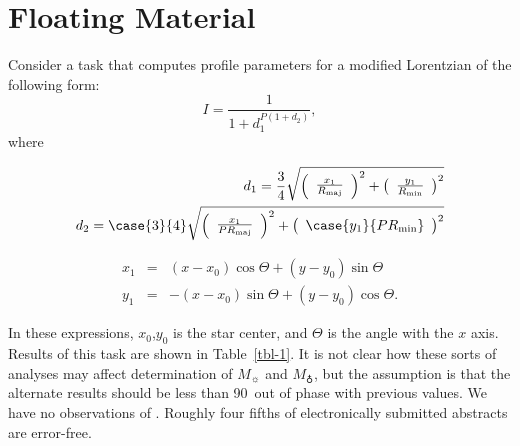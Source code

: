
\section{Floating Material}
Consider a task that computes profile parameters for a modified 
Lorentzian of the following form:
\begin{equation}
   I = \frac{1}{1 + d_{1}^{P (1 + d_{2} )}}, 
\end{equation}
where
\begin{mathletters}
\begin{eqnarray}
   d_{1} = \frac{3}{4} \sqrt{ \left( \begin{array}{c} 
   \frac{x_{1}}{R_{\rm maj}} 
   \end{array} \right) ^{2} + \left( 
   \begin{array}{c} \frac{y_{1}}{R_{\rm min}} 
   \end{array} \right) ^{2} } \\
   d_{2} = \case{3}{4} \sqrt{ \left( 
   \begin{array}{c} \frac{x_{1}}{P R_{\rm maj}}
   \end{array} \right) ^{2} + \left( 
   \begin{array}{c} \case{y_{1}}{P R_{\rm min}} 
   \end{array} \right) ^{2} }
\end{eqnarray}
\end{mathletters}
\begin{mathletters}
\begin{eqnarray}
   x_{1} & = & (x - x_{0}) \cos \Theta + (y - y_{0}) \sin \Theta \\ 
   y_{1} & = & -(x - x_{0}) \sin \Theta + (y - y_{0}) \cos \Theta. 
\end{eqnarray}
\end{mathletters}
In these expressions, $x_{0}$,$y_{0}$ is the star center, and $\Theta$ 
is the angle with the $x$ axis.  Results of this task are shown in 
Table~\ref{tbl-1}.  It is not clear how these sorts of analyses may 
affect determination of $M_{\sun}$ and $M_{\earth}$, but the assumption 
is that the alternate results should be less than 90\deg\ out of phase 
with previous values.  We have no observations of .  Roughly 
four fifths of electronically submitted abstracts are error-free.

